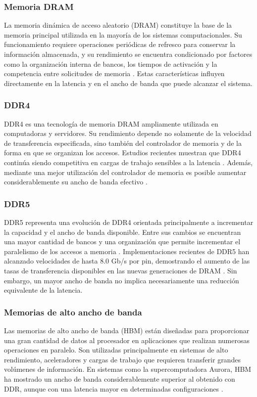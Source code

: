 
\subsubsection{Memoria DRAM}
La memoria dinámica de acceso aleatorio (DRAM) constituye la base de la
memoria principal utilizada en la mayoría de los sistemas computacionales.
Su funcionamiento requiere operaciones periódicas de refresco para conservar
la información almacenada, y su rendimiento se encuentra condicionado por
factores como la organización interna de bancos, los tiempos de activación y
la competencia entre solicitudes de memoria \cite{alawneh2023dram}. Estas
características influyen directamente en la latencia y en el ancho de banda
que puede alcanzar el sistema.
\subsubsection{DDR4}
DDR4 es una tecnología de memoria DRAM ampliamente utilizada en computadoras
y servidores. Su rendimiento depende no solamente de la velocidad de
transferencia especificada, sino también del controlador de memoria y de la
forma en que se organizan los accesos. Estudios recientes muestran que DDR4
continúa siendo competitiva en cargas de trabajo sensibles a la latencia
\cite{steiner2022dramsys}. Además, mediante una mejor utilización del
controlador de memoria es posible aumentar considerablemente su ancho de banda
efectivo \cite{shahbazi2026ddr4}.
\subsubsection{DDR5}
DDR5 representa una evolución de DDR4 orientada principalmente a incrementar
la capacidad y el ancho de banda disponible. Entre sus cambios se encuentran
una mayor cantidad de bancos y una organización que permite incrementar el
paralelismo de los accesos a memoria \cite{steiner2022dramsys}. Implementaciones
recientes de DDR5 han alcanzado velocidades de hasta 8.0 Gb/s por pin,
demostrando el aumento de las tasas de transferencia disponibles en las nuevas
generaciones de DRAM \cite{choi2024ddr5}. Sin embargo, un mayor ancho de banda
no implica necesariamente una reducción equivalente de la latencia.
\subsubsection{Memorias de alto ancho de banda}
Las memorias de alto ancho de banda (HBM) están diseñadas para proporcionar
una gran cantidad de datos al procesador en aplicaciones que realizan numerosas
operaciones en paralelo. Son utilizadas principalmente en sistemas de alto
rendimiento, aceleradores y cargas de trabajo que requieren transferir grandes
volúmenes de información. En sistemas como la supercomputadora Aurora, HBM ha
mostrado un ancho de banda considerablemente superior al obtenido con DDR,
aunque con una latencia mayor en determinadas configuraciones
\cite{ibeid2025aurora}.

